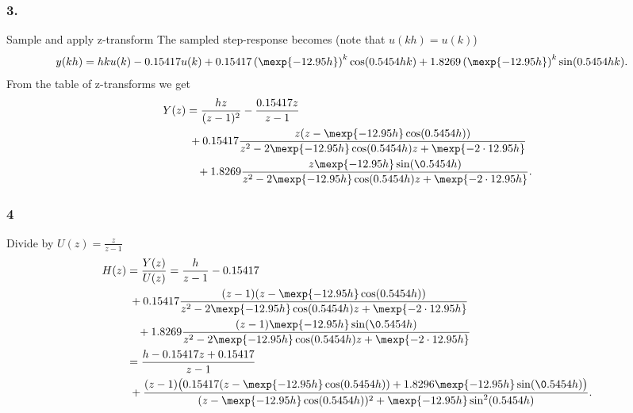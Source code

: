 \documentclass{scrartcl}
\begin{document}
\subsubsection*{3.}
\label{sec-8-2-3}

    Sample and apply z-transform
   The sampled step-response becomes (note that $u(kh) = u(k)$)
    \begin{equation*}
     \begin{split}
      y(kh) &= hku(k) - 0.15417u(k) + 0.15417\left(\mexp{-12.95h}\right)^k\cos(0.5454hk) + 1.8269\left(\mexp{-12.95h}\right)^k\sin(0.5454hk).
     \end{split}
    \end{equation*}
   From the table of z-transforms we get
    \begin{equation*}
     \begin{split}
      Y(z) &= \frac{hz}{(z-1)^2} - \frac{0.15417z}{z-1} \\
           &\; + 0.15417 \frac{z(z-\mexp{-12.95h}\cos(0.5454h))}{z^2 - 2\mexp{-12.95h}\cos(0.5454h)z + \mexp{-2\cdot{}12.95h}}\\
           & \quad + 1.8269 \frac{z\mexp{-12.95h}\sin(\0.5454h)}{z^2 - 2\mexp{-12.95h}\cos(0.5454h)z + \mexp{-2\cdot{}12.95h}}.
     \end{split}
    \end{equation*}
\subsubsection*{4}
\label{sec-8-2-4}

    Divide by $U(z) = \frac{z}{z-1}$
       \begin{equation*}
        \begin{split}
         H(z) &= \frac{Y(z)}{U(z)} = \frac{h}{z-1} - 0.15417\\
              &\; + 0.15417 \frac{(z-1)(z-\mexp{-12.95h}\cos(0.5454h))}{z^2 - 2\mexp{-12.95h}\cos(0.5454h)z + \mexp{-2\cdot{}12.95h}}\\
              &\quad + 1.8269 \frac{(z-1)\mexp{-12.95h}\sin(\0.5454h)}{z^2 - 2\mexp{-12.95h}\cos(0.5454h)z + \mexp{-2\cdot{}12.95h}}\\
      &= \frac{h-0.15417z + 0.15417}{z-1}\\ &\; + \frac{(z-1)\big(0.15417(z-\mexp{-12.95h}\cos(0.5454h)) + 1.8296\mexp{-12.95h}\sin(\0.5454h)\big)}{(z-\mexp{-12.95h}\cos(0.5454h))^2 + \mexp{-12.95h}\sin^2(0.5454h)}.
        \end{split}
       \end{equation*}
\end{document}
